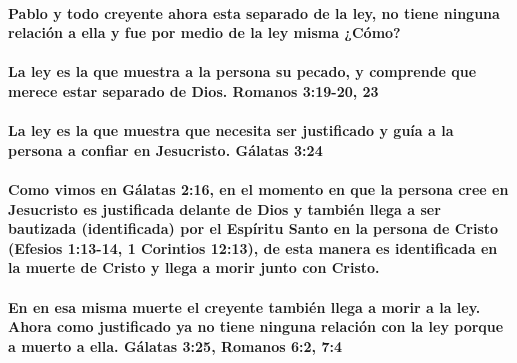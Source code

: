 \documentclass[11a pt,twoside]{article}
\let\oldparagraph\paragraph
\renewcommand{\paragraph}{\needspace{3\baselineskip}\oldparagraph}
\begin{document}
\paragraph{Pablo y todo creyente ahora esta separado de la ley, no tiene
ninguna relación a ella y fue por medio de la ley misma
¿Cómo?}\label{pablo-y-todo-creyente-ahora-esta-separado-de-la-ley-no-tiene-ninguna-relaciuxf3n-a-ella-y-fue-por-medio-de-la-ley-misma-cuxf3mo}

\paragraph{La ley es la que muestra a la persona su pecado, y comprende
que merece estar separado de Dios. Romanos 3:19-20,
23}\label{la-ley-es-la-que-muestra-a-la-persona-su-pecado-y-comprende-que-merece-estar-separado-de-dios.-romanos-319-20-23}

\paragraph{La ley es la que muestra que necesita ser justificado y guía
a la persona a confiar en Jesucristo. Gálatas
3:24}\label{la-ley-es-la-que-muestra-que-necesita-ser-justificado-y-guuxeda-a-la-persona-a-confiar-en-jesucristo.-guxe1latas-324}

\paragraph{Como vimos en Gálatas 2:16, en el momento en que la persona
cree en Jesucristo es justificada delante de Dios y también llega a ser
bautizada (identificada) por el Espíritu Santo en la persona de Cristo
(Efesios 1:13-14, 1 Corintios 12:13), de esta manera es identificada en
la muerte de Cristo y llega a morir junto con
Cristo.}\label{como-vimos-en-guxe1latas-216-en-el-momento-en-que-la-persona-cree-en-jesucristo-es-justificada-delante-de-dios-y-tambiuxe9n-llega-a-ser-bautizada-identificada-por-el-espuxedritu-santo-en-la-persona-de-cristo-efesios-113-14-1-corintios-1213-de-esta-manera-es-identificada-en-la-muerte-de-cristo-y-llega-a-morir-junto-con-cristo.}

\paragraph{En en esa misma muerte el creyente también llega a morir a la
ley. Ahora como justificado ya no tiene ninguna relación con la ley
porque a muerto a ella. Gálatas 3:25, Romanos 6:2,
7:4}\label{en-en-esa-misma-muerte-el-creyente-tambiuxe9n-llega-a-morir-a-la-ley.-ahora-como-justificado-ya-no-tiene-ninguna-relaciuxf3n-con-la-ley-porque-a-muerto-a-ella.-guxe1latas-325-romanos-62-74}
\end{document}
